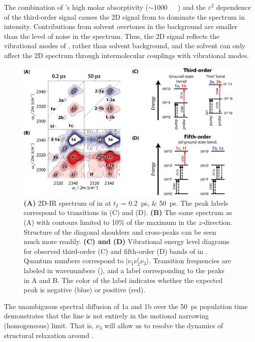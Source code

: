The combination of 's high molar absorptivity ($\sim$\SI{1000}{\per\Molar\wavenumber}) and the $\varepsilon^2$ dependence of the third-order signal causes the 2D signal from  to dominate the spectrum in intensity. Contributions from solvent overtones in the background are smaller than the level of noise in the spectrum. Thus, the 2D signal reflects the vibrational modes of , rather than solvent background, and the solvent can only affect the 2D spectrum through intermolecular couplings with  vibrational modes.
\begin{figure}
	\includegraphics[scale=1]{./anions/fig5_update4.eps}
	\caption[2D-IR spectra of carbon dioxide in ionic liquids]{\label{fig:example 2D}\textbf{(A)} 2D-IR spectrum of  in \ce{[Im_{4,1}][TFA]} at $t_2$ = \SIlist[list-units = single]{0.2;50}{\ps}. The peak labels correspond to transitions in (C) and (D). \textbf{(B)} The same spectrum as (A) with contours limited to 10\% of the maximum in the $z$-direction. Structure of the diagonal shoulders and cross-peaks can be seen much more readily. \textbf{(C) and (D)} Vibrational energy level diagrams for observed third-order (C) and fifth-order (D) bands of  in \ce{[Im_{4,1}][TFA]}. Quantum numbers correspond to $|\nu_1 \nu_2^l \nu_3\rangle$. Transition frequencies are labeled in wavenumbers (\si{\wavenumber}), and a label corresponding to the peaks in A and B. The color of the label indicates whether the expected peak is negative (blue) or positive (red).}
\end{figure}

The unambiguous spectral diffusion of 1a and 1b over the \SI{50}{\ps} population time demonstrates that the line is not entirely in the motional narrowing (homogeneous) limit. That is, $\nu_3$ will allow us to resolve the dynamics of structural relaxation around .

